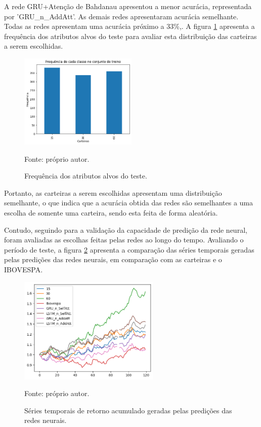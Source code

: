         \ipar A rede \acrshort{GRU}+Atenção de Bahdanau apresentou a menor acurácia, representada por 'GRU\_n\_AddAtt'. As demais redes apresentaram acurácia semelhante. Todas as redes apresentam uma acurácia próximo a 33\%,. A figura \ref{fig:freq} apresenta a frequência dos atributos alvos do teste para avaliar esta distribuição das carteiras a serem escolhidas.

        \begin{figure}[H]
            \centering
            \caption{Frequência dos atributos alvos do teste.}
            \label{fig:freq}
            \includegraphics[width=0.5\textwidth]{./imagens/freq.png}
            \par \footnotesize Fonte: próprio autor.
        \end{figure}

        \ipar Portanto, as carteiras a serem escolhidas apresentam uma distribuição semelhante, o que indica que a acurácia obtida das redes são semelhantes a uma escolha de somente uma carteira, sendo esta feita de forma aleatória.

        \ipar Contudo, seguindo para a validação da capacidade de predição da rede neural, foram avaliadas as escolhas feitas pelas redes ao longo do tempo. Avaliando o período de teste, a figura \ref{fig:backtest_ts} apresenta a comparação das séries temporais geradas pelas predições das redes neurais, em comparação com as carteiras e o \acrshort{IBOVESPA}.

        \begin{figure}[H]
            \centering
            \caption{Séries temporais de retorno acumulado geradas pelas predições das redes neurais.}
            \label{fig:backtest_ts}
            \includegraphics[width=0.6\textwidth]{./imagens/backtest_ts.png}
            \par \footnotesize Fonte: próprio autor.
        \end{figure}

